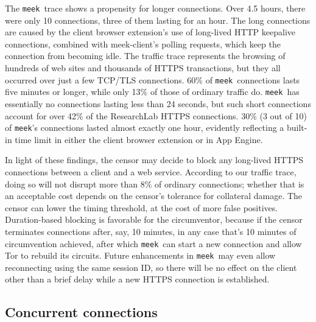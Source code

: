 \documentclass[conference]{IEEEtran}
\newcommand{\meekclient}{\mbox{meek-client}\xspace}
\newcommand{\meek}{\texttt{meek}\xspace}
\newcommand{\lbl}{ResearchLab\xspace}
\begin{document}
The \meek\ trace shows a propensity for longer connections.
Over 4.5 hours, there were only 10 connections,
three of them lasting for an hour.
The long connections are caused by the client browser extension's
use of long-lived HTTP keepalive connections,
combined with \meekclient's polling requests,
which keep the connection from becoming idle.
The traffic trace represents the browsing of hundreds of web sites
and thousands of HTTPS transactions, but they all
occurred over just a few TCP/TLS connections.
60\% of \meek\ connections lasts five minutes or longer,
while only 13\% of those of ordinary traffic do.
\meek\ has essentially no connections lasting less than 24 seconds,
but such short connections account for over 42\% of the \lbl HTTPS connections.
30\% (3 out of 10) of \meek's connections lasted almost exactly one hour,
evidently reflecting a built-in time limit in either the client browser extension
or in App Engine.

In light of these findings,
the censor may decide to block any long-lived HTTPS connections between
a client and a web service.
According to our traffic trace, doing so will not disrupt more than 8\% of ordinary connections;
whether that is an acceptable cost depends on the censor's
tolerance for collateral damage.
The censor can lower the timing threshold, at the cost of more false positives.
Duration-based blocking is favorable for the circumventor,
because if the censor terminates connections after, say, 10 minutes,
in any case that's 10 minutes of circumvention achieved,
after which \meek\ can start a new connection
and allow Tor to rebuild its circuits.
Future enhancements in \meek\ may even allow reconnecting using the same session ID,
so there will be no effect on the client other than a brief delay
while a new HTTPS connection is established.


\subsection{Concurrent connections}

\end{document}
